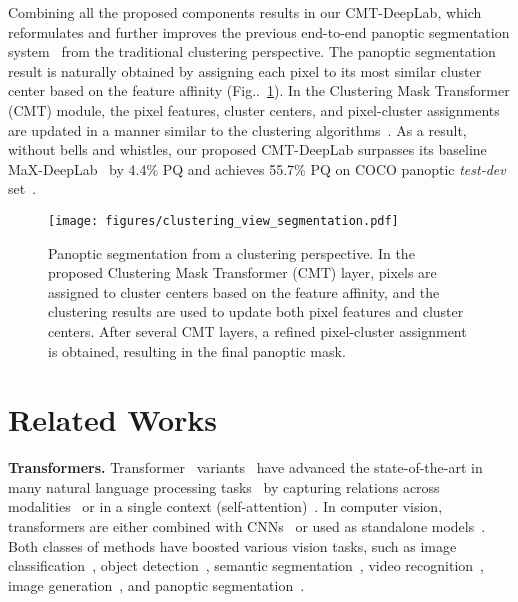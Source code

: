 \documentclass[10pt,twocolumn,letterpaper]{article}
\makeatletter
\DeclareRobustCommand\onedot{\futurelet\@let@token\@onedot}
\def\@onedot{\ifx\@let@token.\else.\null\fi\xspace}
\newcommand{\figref}[1]{Fig\onedot~\ref{#1}}
\makeatother
\begin{document}
Combining all the proposed components results in our CMT-DeepLab, which reformulates and further improves the previous end-to-end panoptic segmentation system~\cite{wang2021max} from the traditional clustering perspective. The panoptic segmentation result is naturally obtained by assigning each pixel to its most similar cluster center based on the feature affinity (\figref{fig:clusterview_of_seg}). In the Clustering Mask Transformer (CMT) module, the pixel features, cluster centers, and pixel-cluster assignments are updated in a manner similar to the clustering algorithms~\cite{lloyd1982least,achanta2012slic}. As a result, without bells and whistles, our proposed CMT-DeepLab surpasses its baseline MaX-DeepLab~\cite{wang2021max} by 4.4\% PQ and achieves 55.7\% PQ on COCO panoptic {\it test-dev} set~\cite{lin2014microsoft}.

\begin{figure}[t]
    \centering
    \texttt{[image: figures/clustering\_view\_segmentation.pdf]}
    \caption{Panoptic segmentation from a clustering perspective. In the proposed Clustering Mask Transformer (CMT) layer, pixels are assigned to cluster centers based on the feature affinity, and the clustering results are used to update both pixel features and cluster centers. After several CMT layers, a refined pixel-cluster assignment is obtained, resulting in the final panoptic mask.
    }
    \label{fig:clusterview_of_seg}
\end{figure} \section{Related Works}
\label{sec:related}

\noindent\textbf{Transformers.}
Transformer~\cite{vaswani2017attention} variants~\cite{kitaev2020reformer,wang2020linformer,luong2015effective,child2019generating,beltagy2020longformer,zaheer2020big,gupta2020gmat,ainslie2020etc} have advanced the state-of-the-art in many natural language processing tasks~\cite{devlin2019bert,shaw2018self,dai2019transformer} by capturing relations across modalities~\cite{bahdanau2014neural} or in a single context (self-attention)~\cite{cheng2016long,vaswani2017attention}. In computer vision, transformers are either combined with CNNs~\cite{wang2018non,buades2005non} or used as standalone models~\cite{parmar2019stand,hu2019local,wang2020axial,dosovitskiy2020image,liu2021swin}. Both classes of methods have boosted various vision tasks, such as image classification~\cite{chen20182,bello2019attention, parmar2019stand,hu2019local,li2020neural,wang2020axial,dosovitskiy2020image,liu2021swin}, object detection~\cite{wang2018non,shen2021efficient,parmar2019stand,hu2018relation,carion2020end,zhu2020deformable}, semantic segmentation~\cite{chen2016attention,zhao2018psanet,huang2019ccnet,fu2019dual,zhu2019asymmetric,zhu2019empirical}, video recognition~\cite{wang2018non,chen20182,kim2022tubeformer}, image generation~\cite{parmar2018image,ho2019axial}, and panoptic segmentation~\cite{wang2020axial}.
\end{document}
